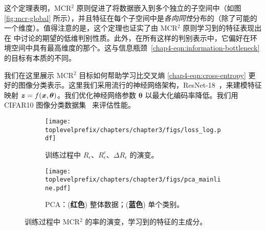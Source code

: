 \documentclass[../../book-main_zh.tex]{subfiles}
\begin{document}
这个定理表明，MCR$^2$ 原则促进了将数据嵌入到多个独立的子空间中（如图 \ref{fig:mcr-global} 所示），并且特征在每个子空间中是{\em 各向同性}分布的（除了可能的一个维度）。值得注意的是，这个定理也证实了由 MCR$^2$ 原则学习到的特征表现出在  中讨论的期望的低维判别性质。此外，在所有这样的判别表示中，它偏好在环境空间中具有最高维度的那个。这与信息瓶颈~\eqref{chap4-eqn:information-bottleneck} 的目标有本质的不同。



\begin{example}
	我们在这里展示 MCR$^2$ 目标如何帮助学习比交叉熵 \eqref{chap4-eqn:cross-entropy} 更好的图像分类表示。这里我们采用流行的神经网络架构，ResNet-18~\cite{he2016deep}，来建模特征映射 $\bm{z} = f(\bm{x},\bm \theta)$。我们优化神经网络参数 $\bm \theta$ 以最大化编码率降低。我们用 CIFAR10 图像分类数据集~\cite{krizhevsky2009learning} 来评估性能。

	\begin{figure}[t]
		\begin{subfigure}[t]{0.42\textwidth}
			\centering
			\texttt{[image: \\toplevelprefix/chapters/chapter3/figs/loss\_log.pdf]}
			\caption{训练过程中 $R_\epsilon$、$R^c_\epsilon$、$\Delta R_\epsilon$ 的演变。}
			\label{fig:train-test-loss-pca-1}
		\end{subfigure}
		\hfill
		\begin{subfigure}[t]{0.42\textwidth}
			\centering
			\texttt{[image: \\toplevelprefix/chapters/chapter3/figs/pca\_mainline.pdf]}
			\caption{PCA：{\small (\textbf{红色}) 整体数据；(\textbf{蓝色}) 单个类别。}}
			\label{fig:train-test-loss-pca-3}
		\end{subfigure}
		\caption{\small 训练过程中 MCR$^2$ 的率的演变，学习到的特征的主成分。}
		\label{fig:train-test-loss-pca}
	\end{figure}



\end{example}
\end{document}
